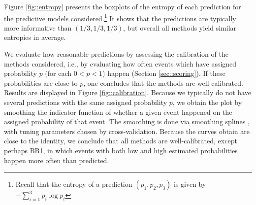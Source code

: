 \documentclass[journal,article,accept,moreauthors,pdftex,12pt,a4paper]{mdpi}
\begin{document}
Figure \ref{fig::entropy} presents the boxplots of the entropy of each prediction for the predictive models considered.\footnote{Recall
that the entropy of a prediction $(p_1,p_2,p_3)$ is given by $- \sum_{i=1}^3 p_i \log{p_i}$} It shows that the predictions
are typically more informative than $(1/3,1/3,1/3)$, but overall all methods yield similar entropies in average.

We evaluate how reasonable  predictions by assessing the calibration of the methods considered, i.e., by evaluating how often events which have assigned probability $p$ (for each $0<p<1$) happen  (Section \ref{sec::scoring}).
If these probabilities are close to $p$, one concludes that the methods are well-calibrated. 
Results are displayed in Figure \ref{fig::calibration}.
Because we typically do not have several predictions with the same assigned probability $p$, we obtain the plot by smoothing the indicator function of whether a given event happened on  the assigned  probability of that event. 
The smoothing is done via smoothing splines \cite{wahba}, with tuning parameters chosen by cross-validation.
Because the curves obtain  are close to the identity, we conclude that all methods are well-calibrated, except perhaps BB1, in which events with both low and high estimated probabilities happen more often 
than predicted.
\end{document}
